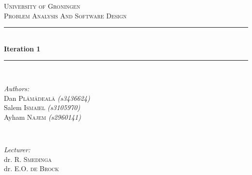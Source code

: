 \documentclass[11pt]{article}
\begin{document}
\newcommand{\iterno}{1}
\newcommand{\projectname}{Ferry Service}

\newcommand{\studentA}{Dan \textsc{\textsc{Pl\u{a}m\u{a}deal\u{a}}} \textit{(s3436624)}}
\newcommand{\studentB}{Salem \textsc{Ismaiel} \textit{(s3105970)}}
\newcommand{\studentC}{Ayham \textsc{Najem} \textit{(s2960141)}}

\newcommand{\creator}[1]{{\it\small Created by: #1\\}}
\newcommand{\updater}[1]{{\it\small First update by: #1\\}}
\newcommand{\secondUpdater}[1]{{\it\small Second update by: #1\\}}

\begin{titlepage}

\newcommand{\HRule}{\rule{\linewidth}{0.5mm}} %

\center %
 

\textsc{\LARGE University of Groningen}\\[1.5cm] %
\textsc{\Large Problem Analysis And Software Design}\\[0.5cm] %

\HRule \\[0.4cm]
{ \huge \bfseries Iteration \iterno}\\[0.4cm] %
\HRule \\[1.5cm]

\begin{minipage}{0.5\textwidth}
\begin{flushleft} \large
\emph{Authors:}\\
\studentA \\
\studentB \\
\studentC
\end{flushleft}
\end{minipage}
~
\begin{minipage}{0.4\textwidth}
\begin{flushright} \large
\emph{Lecturer:} \\
dr. R. \textsc{Smedinga} \\
dr. E.O. \textsc{de Brock}


\end{flushright}
\end{minipage}
\end{titlepage}
\end{document}
